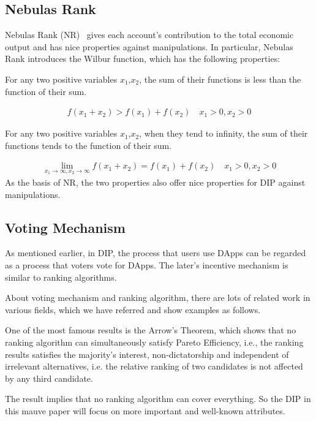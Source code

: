 \subsection{Nebulas Rank}
Nebulas Rank (NR)~\cite{Nebulasyellowpaper} gives each account's contribution to the total economic output and has nice properties against manipulations. In particular, Nebulas Rank introduces the Wilbur function, which has the following properties: 

\begin{property}
	\label{prop:one}
	For any two positive variables $x_1$,$x_2$, the sum of their functions is less than the function of their sum. 
\end{property}
\begin{align}
	f(x_1+x_2)>f(x_1)+f(x_2) \quad x_1>0,x_2>0
\end{align}
\begin{property}
	\label{prop:two}
	For any two positive variables $x_1$,$x_2$, when they tend to infinity, the sum of their functions tends to the function of their sum. 
\end{property}

\begin{align}
	\lim\limits_{x_1 \to \infty, x_2\to \infty} f(x_1+x_2) = f(x_1) + f(x_2)\quad x_1>0, x_2>0
\end{align}
\noindent As the basis of NR, the two properties also offer nice properties for DIP against manipulations. 

\subsection{Voting Mechanism}
As mentioned earlier, in DIP, the process that users use DApps can be regarded as a process that voters vote for DApps. The later's incentive mechanism is similar to ranking algorithms. 

About voting mechanism and ranking algorithm, there are lots of related work in various fields, which we have referred and show examples as follows. 

One of the most famous results is the Arrow's Theorem, which shows that no ranking algorithm can simultaneously satisfy Pareto Efficiency, i.e., the ranking results satisfies the majority's interest, non-dictatorship and independent of irrelevant alternatives, i.e. the relative ranking of two candidates is not affected by any third candidate. 

The result implies that no ranking algorithm can cover everything. So the DIP in this mauve paper will focus on more important and well-known attributes. 

